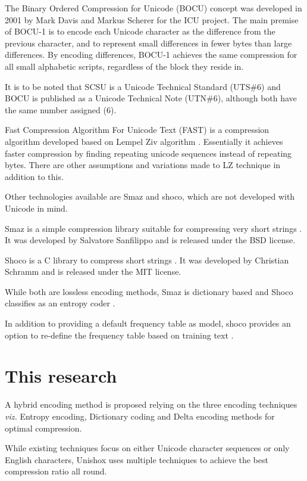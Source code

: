 \documentclass[]{article}
\begin{document}
The Binary Ordered Compression for Unicode (BOCU) concept was developed in 2001 by Mark Davis and Markus Scherer for the ICU project. The main premise of BOCU-1 is to encode each Unicode character as the difference from the previous character, and to represent small differences in fewer bytes than large differences. By encoding differences, BOCU-1 achieves the same compression for all small alphabetic scripts, regardless of the block they reside in. \cite{11} \cite{13}

It is to be noted that SCSU is a Unicode Technical Standard (UTS\#6) and BOCU is published as a Unicode Technical Note (UTN\#6), although both have the same number assigned (6).

Fast Compression Algorithm For Unicode Text (FAST) is a compression algorithm developed based on Lempel Ziv algorithm \cite{4}. Essentially it achieves faster compression by finding repeating unicode sequences instead of repeating bytes. There are other assumptions and variations made to LZ technique in addition to this. \cite{12}

Other technologies available are Smaz and shoco, which are not developed with Unicode in mind.

Smaz is a simple compression library suitable for compressing very short strings \cite{14}. It was developed by Salvatore Sanfilippo and is released under the BSD license.

Shoco is a C library to compress short strings \cite{15}. It was developed by Christian Schramm and is released under the MIT license.

While both are lossless encoding methods, Smaz is dictionary based and Shoco classifies as an entropy coder \cite{15}.

In addition to providing a default frequency table as model, shoco provides an option to re-define the frequency table based on training text \cite{15}.

\section{This research}

A hybrid encoding method is proposed relying on the three encoding techniques \emph{viz.} Entropy encoding, Dictionary coding and Delta encoding methods for optimal compression.

While existing techniques focus on either Unicode character sequences or only English characters, Unishox uses multiple techniques to achieve the best compression ratio all round.
\end{document}
